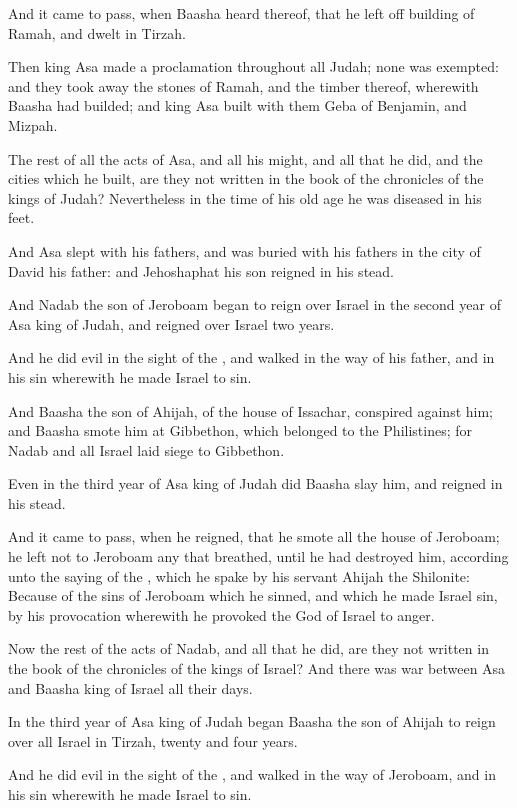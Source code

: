 \verse And it came to pass, when Baasha heard thereof, that he left off building of Ramah, and dwelt in Tirzah.

\verse Then king Asa made a proclamation throughout all Judah; none was exempted: and they took away the stones of Ramah, and the timber thereof, wherewith Baasha had builded; and king Asa built with them Geba of Benjamin, and Mizpah.

\verse The rest of all the acts of Asa, and all his might, and all that he did, and the cities which he built, are they not written in the book of the chronicles of the kings of Judah? Nevertheless in the time of his old age he was diseased in his feet.

\verse And Asa slept with his fathers, and was buried with his fathers in the city of David his father: and Jehoshaphat his son reigned in his stead.

\verse And Nadab the son of Jeroboam began to reign over Israel in the second year of Asa king of Judah, and reigned over Israel two years.

\verse And he did evil in the sight of the \LORD, and walked in the way of his father, and in his sin wherewith he made Israel to sin.

\verse And Baasha the son of Ahijah, of the house of Issachar, conspired against him; and Baasha smote him at Gibbethon, which belonged to the Philistines; for Nadab and all Israel laid siege to Gibbethon.

\verse Even in the third year of Asa king of Judah did Baasha slay him, and reigned in his stead.

\verse And it came to pass, when he reigned, that he smote all the house of Jeroboam; he left not to Jeroboam any that breathed, until he had destroyed him, according unto the saying of the \LORD, which he spake by his servant Ahijah the Shilonite: \verse Because of the sins of Jeroboam which he sinned, and which he made Israel sin, by his provocation wherewith he provoked the \LORD God of Israel to anger.

\verse Now the rest of the acts of Nadab, and all that he did, are they not written in the book of the chronicles of the kings of Israel?  \verse And there was war between Asa and Baasha king of Israel all their days.

\verse In the third year of Asa king of Judah began Baasha the son of Ahijah to reign over all Israel in Tirzah, twenty and four years.

\verse And he did evil in the sight of the \LORD, and walked in the way of Jeroboam, and in his sin wherewith he made Israel to sin.


